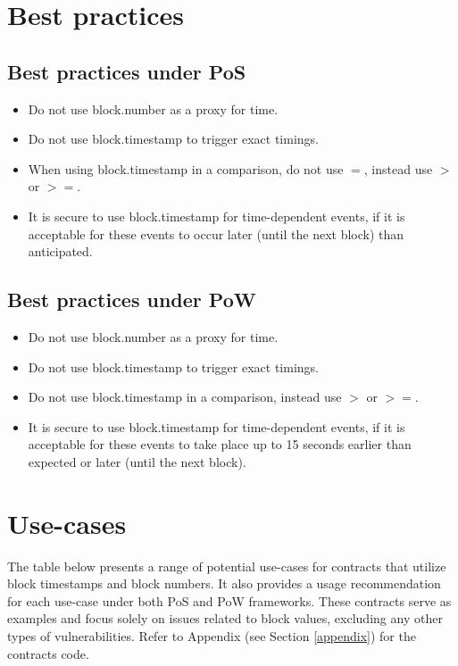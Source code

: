 \section{Best practices}
\subsection{Best practices under PoS}
\begin{itemize}
  \item Do not use block.number as a proxy for time.
  \item Do not use block.timestamp to trigger exact timings.
  \item When using block.timestamp in a comparison, do not use $=$, instead use $>$ or $>=$.
  \item It is secure to use block.timestamp for time-dependent events, if it is acceptable for these events to occur later (until the next block) than anticipated. \\
\end{itemize}

\subsection{Best practices under PoW}
\begin{itemize}
  \item Do not use block.number as a proxy for time.
  \item Do not use block.timestamp to trigger exact timings.
  \item Do not use block.timestamp in a comparison, instead use $>$ or $>=$.
  \item It is secure to use block.timestamp for time-dependent events, if it is acceptable for these events to take place up to 15 seconds earlier than expected or later (until the next block). \\
\end{itemize}

\newpage
\section{Use-cases}

The table below presents a range of potential use-cases for contracts that
utilize block timestamps and block numbers. It also provides a usage recommendation
for each use-case under both PoS and PoW frameworks. These contracts serve as
examples and focus solely on issues related to block values, excluding any
other types of vulnerabilities. Refer to Appendix (see Section \ref{appendix})
for the contracts code.

